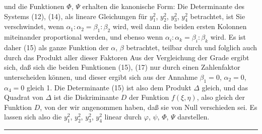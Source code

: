 und die Funktionen $\Phi$, $\Psi$ erhalten die kanonische Form:
Die Determinante des Systems (12), (14), als lineare Gleichungen für
$y_1^2$, $y_2^2$, $y_3^2$, $y_4^2$ betrachtet, ist
Sie verschwindet, wenn $\alpha_1:\alpha_2 = \beta_1:\beta_2$ wird, weil
dann die beiden ersten Kolonnen miteinander proportional werden, und
ebenso wenn $\alpha_i:\alpha_k = \beta_i:\beta_k$ wird. Es ist daher
(15) als ganze Funktion der $\alpha$, $\beta$ betrachtet, teilbar durch
und folglich auch durch das Produkt aller dieser Faktoren
Aus der Vergleichung der Grade ergibt sich, daß sich die beiden
Funktionen (15), (17) nur durch einen Zahlenfaktor unterscheiden
können, und dieser ergibt sich aus der Annahme $\beta_1 = 0$,
$\alpha_2 = 0$, $\alpha_4 = 0$ gleich 1. Die Determinante (15) ist
also dem Produkt $\Delta$ gleich, und das Quadrat von $\Delta$ ist die
Diskriminante $D$ der Funktion $f(\xi,\eta)$, also gleich der
Funktion $D$, von der wir angenommen haben, daß sie von Null
verschieden sei. Es lassen sich also die $y_1^2$, $y_2^2$, $y_3^2$,
$y_4^2$ linear durch $\varphi$, $\psi$, $\Phi$, $\Psi$ darstellen.

\begin{center}
\rule{2cm}{0.4pt}
\end{center}

